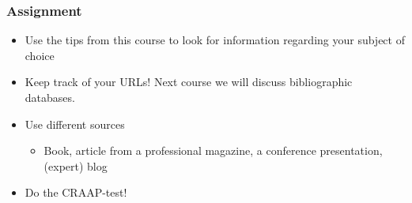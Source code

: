 \documentclass[aspectratio=169]{beamer}
\begin{document}
\begin{frame}
    \frametitle{Assignment}
  
    \begin{itemize}
      \item Use the tips from this course to look for information regarding your subject of choice
      \item Keep track of your URLs! Next course we will discuss bibliographic databases.
      \item Use different sources
            \begin{itemize}
              \item Book, article from a professional magazine, a conference presentation, (expert) blog 
            \end{itemize}
      \item Do the CRAAP-test!
    \end{itemize}
  
  \end{frame}
\end{document}
